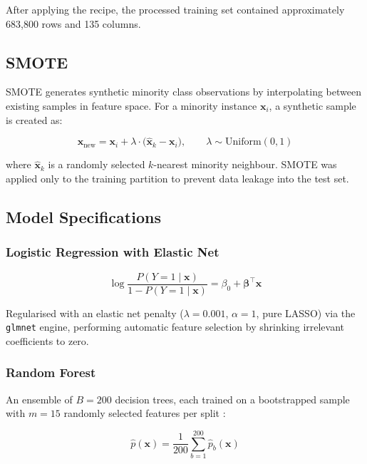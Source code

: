 \documentclass[12pt, a4paper]{article}
\begin{document}
After applying the recipe, the processed training set contained approximately
683,800 rows and 135 columns.

\subsection{SMOTE}

SMOTE \cite{chawla2002} generates synthetic minority class observations by
interpolating between existing samples in feature space. For a minority instance
$\mathbf{x}_i$, a synthetic sample is created as:

\begin{equation}
    \mathbf{x}_{\text{new}} = \mathbf{x}_i +
    \lambda \cdot \bigl(\hat{\mathbf{x}}_k - \mathbf{x}_i\bigr),
    \qquad \lambda \sim \text{Uniform}(0,1)
\end{equation}

where $\hat{\mathbf{x}}_k$ is a randomly selected $k$-nearest minority neighbour.
SMOTE was applied only to the training partition to prevent data leakage into the
test set.

\subsection{Model Specifications}

\subsubsection{Logistic Regression with Elastic Net}

\begin{equation}
    \log \frac{P(Y=1 \mid \mathbf{x})}{1 - P(Y=1 \mid \mathbf{x})}
    = \beta_0 + \boldsymbol{\beta}^{\top}\mathbf{x}
\end{equation}

Regularised with an elastic net penalty ($\lambda = 0.001$, $\alpha = 1$, pure
LASSO) via the \texttt{glmnet} engine, performing automatic feature selection by
shrinking irrelevant coefficients to zero.

\subsubsection{Random Forest}

An ensemble of $B = 200$ decision trees, each trained on a bootstrapped sample with
$m = 15$ randomly selected features per split \cite{breiman2001}:

\begin{equation}
    \hat{p}(\mathbf{x}) = \frac{1}{200} \sum_{b=1}^{200} \hat{p}_b(\mathbf{x})
\end{equation}
\end{document}
